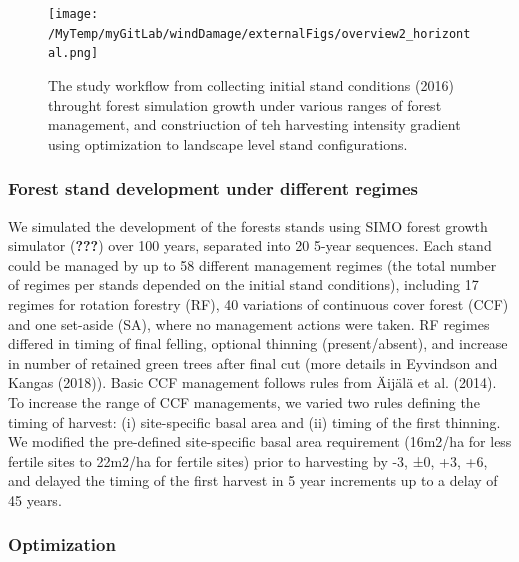 \documentclass[]{elsarticle} %
\begin{document}
\begin{figure}
\centering
\texttt{[image: /MyTemp/myGitLab/windDamage/externalFigs/overview2\_horizontal.png]}
\caption{The study workflow from collecting initial stand conditions
(2016) throught forest simulation growth under various ranges of forest
management, and constriuction of teh harvesting intensity gradient using
optimization to landscape level stand configurations.\label{workflow}}
\end{figure}

\subsubsection{Forest stand development under different
regimes}\label{forest-stand-development-under-different-regimes}

We simulated the development of the forests stands using SIMO forest
growth simulator ({\textbf{???}}) over 100 years, separated into 20
5-year sequences. Each stand could be managed by up to 58 different
management regimes (the total number of regimes per stands depended on
the initial stand conditions), including 17 regimes for rotation
forestry (RF), 40 variations of continuous cover forest (CCF) and one
set-aside (SA), where no management actions were taken. RF regimes
differed in timing of final felling, optional thinning (present/absent),
and increase in number of retained green trees after final cut (more
details in Eyvindson and Kangas (2018)). Basic CCF management follows
rules from Äijälä et al. (2014). To increase the range of CCF
managements, we varied two rules defining the timing of harvest: (i)
site-specific basal area and (ii) timing of the first thinning. We
modified the pre-defined site-specific basal area requirement (16m2/ha
for less fertile sites to 22m2/ha for fertile sites) prior to harvesting
by -3, ±0, +3, +6, and delayed the timing of the first harvest in 5 year
increments up to a delay of 45 years.

\subsubsection{Optimization}\label{optimization}
\end{document}
